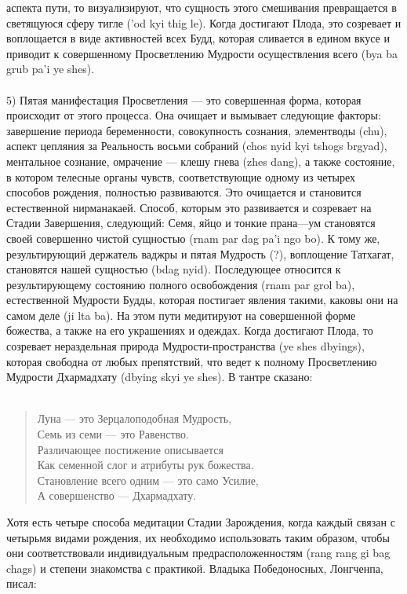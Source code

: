 аспекта пути, то визуализируют, что сущность этого смешивания превращается в
светящуюся сферу тигле ('od kyi thig le). Когда достигают Плода, это созревает и
воплощается в виде активностей всех Будд, которая сливается в едином вкусе и приводит к
совершенному Просветлению Мудрости осуществления всего (bya ba grub pa'i ye shes).\\
\\
5) Пятая манифестация Просветления — это совершенная форма, которая
происходит от этого процесса. Она очищает и вымывает следующие факторы: завершение
периода беременности, совокупность сознания, элементводы (chu), аспект цепляния за
Реальность восьми собраний (chos nyid kyi tshogs brgyad), ментальное сознание, омрачение —
клешу гнева (zhes dang), а также состояние, в котором телесные органы чувств,
соответствующие одному из четырех способов рождения, полностью развиваются. Это
очищается и становится естественной нирманакаей. Способ, которым это развивается и
созревает на Стадии Завершения, следующий: Семя, яйцо и тонкие прана—ум становятся
своей совершенно чистой сущностью (rnam par dag pa'i ngo bo). К тому же, результирующий
держатель ваджры и пятая Мудрость (?), воплощение Татхагат, становятся нашей сущностью
(bdag nyid). Последующее относится к результирующему состоянию полного освобождения
(rnam par grol ba), естественной Мудрости Будды, которая постигает явления такими, каковы
они на самом деле (ji lta ba). На этом пути медитируют на совершенной форме божества, а
также на его украшениях и одеждах. Когда достигают Плода, то созревает нераздельная
природа Мудрости-пространства (ye shes dbyings), которая свободна от любых препятствий,
что ведет к полному Просветлению Мудрости Дхармадхату (dbying skyi ye shes). В тантре
сказано:\\
\\
\begin{verse}
Луна — это Зерцалоподобная Мудрость,\\
Семь из семи — это Равенство.\\
Различающее постижение описывается\\
Как семенной слог и атрибуты рук божества.\\
Становление всего одним — это само Усилие,\\
А совершенство — Дхармадхату.
\end{verse}

Хотя есть четыре способа медитации Стадии Зарождения, когда каждый связан с
четырьмя видами рождения, их необходимо использовать таким образом, чтобы они
соответствовали индивидуальным предрасположенностям (rang rang gi bag chags) и степени
знакомства с практикой. Владыка Победоносных, Лонгченпа, писал:\\

